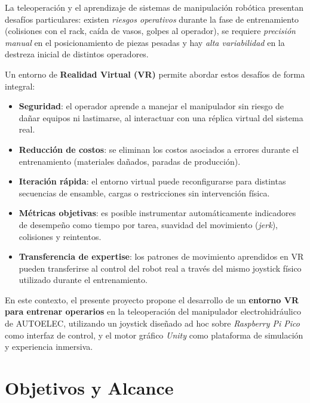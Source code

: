 La teleoperación y el aprendizaje de sistemas de manipulación robótica presentan desafíos particulares: existen \textit{riesgos operativos} durante la fase de entrenamiento (colisiones con el rack, caída de vasos, golpes al operador), se requiere \textit{precisión manual} en el posicionamiento de piezas pesadas y hay \textit{alta variabilidad} en la destreza inicial de distintos operadores.

Un entorno de \textbf{Realidad Virtual (VR)} permite abordar estos desafíos de forma integral:

\begin{itemize}
    \item \textbf{Seguridad}: el operador aprende a manejar el manipulador sin riesgo de dañar equipos ni lastimarse, al interactuar con una réplica virtual del sistema real.
    \item \textbf{Reducción de costos}: se eliminan los costos asociados a errores durante el entrenamiento (materiales dañados, paradas de producción).
    \item \textbf{Iteración rápida}: el entorno virtual puede reconfigurarse para distintas secuencias de ensamble, cargas o restricciones sin intervención física.
    \item \textbf{Métricas objetivas}: es posible instrumentar automáticamente indicadores de desempeño como tiempo por tarea, suavidad del movimiento (\textit{jerk}), colisiones y reintentos.
    \item \textbf{Transferencia de expertise}: los patrones de movimiento aprendidos en VR pueden transferirse al control del robot real a través del mismo joystick físico utilizado durante el entrenamiento.
\end{itemize}

En este contexto, el presente proyecto propone el desarrollo de un \textbf{entorno VR para entrenar operarios} en la teleoperación del manipulador electrohidráulico de AUTOELEC, utilizando un joystick diseñado ad hoc sobre \textit{Raspberry Pi Pico} como interfaz de control, y el motor gráfico \textit{Unity} como plataforma de simulación y experiencia inmersiva.


\section{Objetivos y Alcance}

